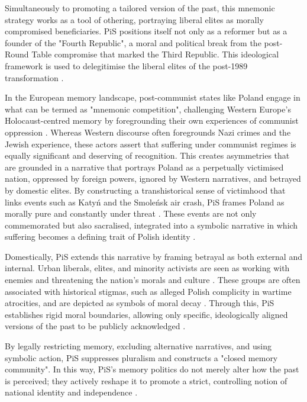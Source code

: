 Simultaneously to promoting a tailored version of the past, this mnemonic strategy works as a tool of othering,  portraying liberal elites as morally compromised beneficiaries. PiS positions itself not only as a reformer but as a founder of the "Fourth Republic", a moral and political break from the post-Round Table compromise that marked the Third Republic. This ideological framework is used to delegitimise the liberal elites of the post-1989 transformation \citep{pozarlik_momentarily_2022}.

In the European memory landscape, post-communist states like Poland engage in what can be termed as "mnemonic competition", challenging Western Europe's Holocaust-centred memory by foregrounding their own experiences of communist oppression \citep{subotic_political_2018}. Whereas Western discourse often foregrounds Nazi crimes and the Jewish experience, these actors assert that suffering under communist regimes is equally significant and deserving of recognition. This creates asymmetries that are grounded in a narrative that portrays Poland as a perpetually victimised nation, oppressed by foreign powers, ignored by Western narratives, and betrayed by domestic elites. By constructing a transhistorical sense of victimhood that links events such as Katyń and the Smoleńsk air crash, PiS frames Poland as morally pure and constantly under threat \citep{fredheim_memory_2014}. These events are not only commemorated but also sacralised, integrated into a symbolic narrative in which suffering becomes a defining trait of Polish identity \citep{riedel_tri-marium_2022}.

Domestically, PiS extends this narrative by framing betrayal as both external and internal. Urban liberals, elites, and minority activists are seen as working with enemies and threatening the nation’s morals and culture \citep{piotrowski_between_2010}. These groups are often associated with historical stigmas, such as alleged Polish complicity in wartime atrocities, and are depicted as symbols of moral decay \citep{kucia_europeanization_2016}. Through this, PiS establishes rigid moral boundaries, allowing only specific, ideologically aligned versions of the past to be publicly acknowledged \citep{grabowski_memory_2018}.

By legally restricting memory, excluding alternative narratives, and using symbolic action, PiS suppresses pluralism and constructs a "closed memory community". In this way, PiS’s memory politics do not merely alter how the past is perceived; they actively reshape it to promote a strict, controlling notion of national identity and independence \citep{assmann_transnational_2014}.

